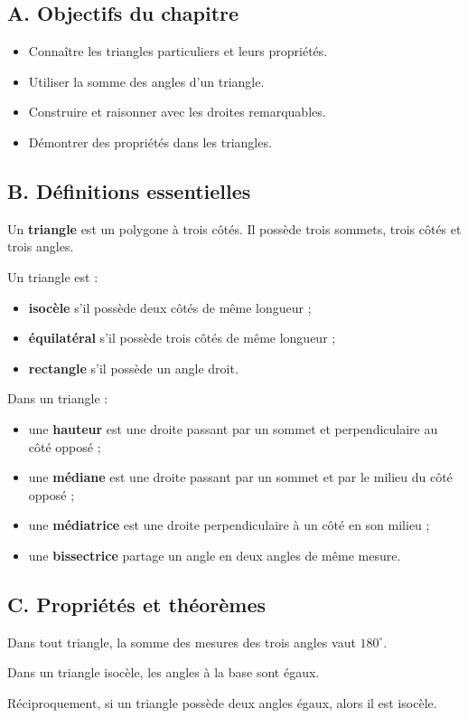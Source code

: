\documentclass[11pt,a4paper]{article}
\newcommand{\objectif}[1]{\subsection*{A. Objectifs du chapitre}#1}
\newcommand{\defs}{\subsection*{B. Définitions essentielles}}
\newcommand{\props}{\subsection*{C. Propriétés et théorèmes}}
\begin{document}
\objectif{
\begin{itemize}
\item Connaître les triangles particuliers et leurs propriétés.
\item Utiliser la somme des angles d'un triangle.
\item Construire et raisonner avec les droites remarquables.
\item Démontrer des propriétés dans les triangles.
\end{itemize}}

\defs
\begin{definitionbox}
Un \textbf{triangle} est un polygone à trois côtés. Il possède trois sommets, trois côtés et trois angles.

Un triangle est :
\begin{itemize}
\item \textbf{isocèle} s'il possède deux côtés de même longueur ;
\item \textbf{équilatéral} s'il possède trois côtés de même longueur ;
\item \textbf{rectangle} s'il possède un angle droit.
\end{itemize}
\end{definitionbox}

\begin{definitionbox}
Dans un triangle :
\begin{itemize}
\item une \textbf{hauteur} est une droite passant par un sommet et perpendiculaire au côté opposé ;
\item une \textbf{médiane} est une droite passant par un sommet et par le milieu du côté opposé ;
\item une \textbf{médiatrice} est une droite perpendiculaire à un côté en son milieu ;
\item une \textbf{bissectrice} partage un angle en deux angles de même mesure.
\end{itemize}
\end{definitionbox}

\props
\begin{proprietebox}
Dans tout triangle, la somme des mesures des trois angles vaut $180^\circ$.
\end{proprietebox}

\begin{proprietebox}
Dans un triangle isocèle, les angles à la base sont égaux.

Réciproquement, si un triangle possède deux angles égaux, alors il est isocèle.
\end{proprietebox}
\end{document}
